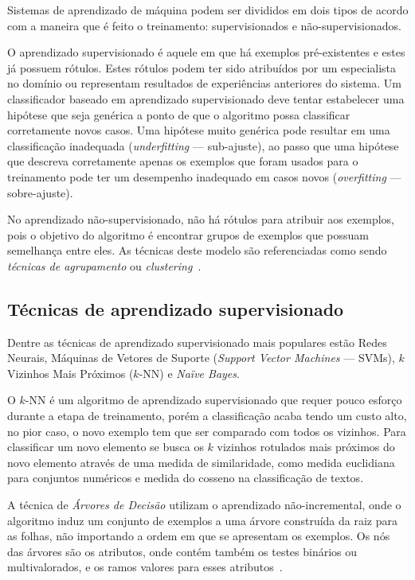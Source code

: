 Sistemas de aprendizado de máquina podem ser divididos em dois tipos de acordo com a maneira que é feito o treinamento: supervisionados e não-supervisionados.

O aprendizado supervisionado é aquele em que há exemplos pré-existentes e estes já possuem rótulos. Estes rótulos podem ter sido atribuídos por um especialista no domínio ou representam resultados de experiências anteriores do sistema. Um classificador baseado em aprendizado supervisionado deve tentar estabelecer uma hipótese que seja genérica a ponto de que o algoritmo possa classificar corretamente novos casos. Uma hipótese muito genérica pode resultar em uma classificação inadequada (\emph{underfitting} --- sub-ajuste), ao passo que uma hipótese que descreva corretamente apenas os exemplos que foram usados para o treinamento pode ter um desempenho inadequado em casos novos (\emph{overfitting} --- sobre-ajuste).

No aprendizado não-supervisionado, não há rótulos para atribuir aos exemplos, pois o objetivo do algoritmo é encontrar grupos de exemplos que possuam semelhança entre eles. As técnicas deste modelo são referenciadas como sendo \emph{técnicas de agrupamento} ou \emph{clustering}~\cite{rezende2003sistemas}.

\subsection{Técnicas de aprendizado supervisionado}

Dentre as técnicas de aprendizado supervisionado mais populares estão Redes Neurais, Máquinas de Vetores de Suporte (\emph{Support Vector Machines} --- SVMs), $k$ Vizinhos Mais Próximos ($k$-NN) e \emph{Naïve Bayes}.


O $k$-NN é um algoritmo de aprendizado supervisionado que requer pouco esforço durante a etapa de treinamento, porém a classificação acaba tendo um custo alto, no pior caso, o novo exemplo tem que ser comparado com todos os vizinhos. Para classificar um novo elemento se busca os $k$ vizinhos rotulados mais próximos do novo elemento através de uma medida de similaridade, como medida euclidiana \cite{ferrero-algoritmo} para conjuntos numéricos e medida do cosseno \cite{tan2006effective} na classificação de textos.

A técnica de \emph{Árvores de Decisão} utilizam o aprendizado não-incremental, onde o algoritmo induz um conjunto de exemplos a uma árvore construída da raiz para as folhas, não importando a ordem em que se apresentam os exemplos. Os nós das árvores são os atributos, onde contém também os testes binários ou multivalorados, e os ramos valores para esses atributos~\cite{de-categorizacao}.

